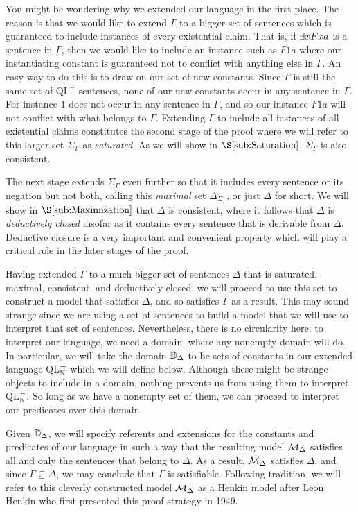 You might be wondering why we extended our language in the first place.
The reason is that we would like to extend $\Gamma$ to a bigger set of sentences which is guaranteed to include instances of every existential claim. 
That is, if $\exists xFxa$ is a sentence in $\Gamma$, then we would like to include an instance such as $F1a$ where our instantiating constant is guaranteed not to conflict with anything else in $\Gamma$.
An easy way to do this is to draw on our set of new constants.
Since $\Gamma$ is still the same set of QL$^=$ sentences, none of our new constants occur in any sentence in $\Gamma$.
For instance $1$ does not occur in any sentence in $\Gamma$, and so our instance $F1a$ will not conflict with what belongs to $\Gamma$. 
Extending $\Gamma$ to include all instances of all existential claims constitutes the second stage of the proof where we will refer to this larger set $\Sigma_\Gamma$ as \textit{saturated}. 
As we will show in $\S\ref{sub:Saturation}$, $\Sigma_\Gamma$ is also consistent. 

The next stage extends $\Sigma_\Gamma$ even further so that it includes every sentence or its negation but not both, calling this \textit{maximal} set $\Delta_{\Sigma_\Gamma}$, or just $\Delta$ for short. 
We will show in $\S\ref{sub:Maximization}$ that $\Delta$ is consistent, where it follows that $\Delta$ is \textit{deductively closed} insofar as it contains every sentence that is derivable from $\Delta$.
Deductive closure is a very important and convenient property which will play a critical role in the later stages of the proof.

Having extended $\Gamma$ to a much bigger set of sentences $\Delta$ that is saturated, maximal, consistent, and deductively closed, we will proceed to use this set to construct a model that satisfies $\Delta$, and so satisfies $\Gamma$ as a result. 
This may sound strange since we are using a set of sentences to build a model that we will use to interpret that set of sentences.
Nevertheless, there is no circularity here: to interpret our language, we need a domain, where any nonempty domain will do.
In particular, we will take the domain $\mathbb{D}_\Delta$ to be sets of constants in our extended language QL$^=_{\mathbb{N}}$ which we will define below.
Although these might be strange objects to include in a domain, nothing prevents us from using them to interpret QL$^=_{\mathbb{N}}$.
So long as we have a nonempty set of them, we can proceed to interpret our predicates over this domain.

Given $\mathbb{D}_{\Delta}$, we will specify referents and extensions for the constants and predicates of our language in such a way that the resulting model $\mathcal{M}_\Delta$ satisfies all and only the sentences that belong to $\Delta$.
As a result, $\mathcal{M}_\Delta$ satisfies $\Delta$, and since $\Gamma\subseteq\Delta$, we may conclude that $\Gamma$ is satisfiable. 
Following tradition, we will refer to this cleverly constructed model $\mathcal{M}_\Delta$ as a Henkin model after Leon Henkin who first presented this proof strategy in 1949.

